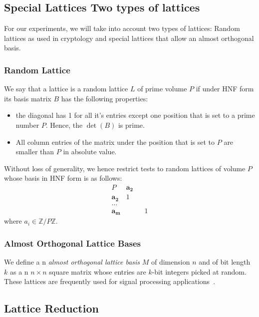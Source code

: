 \documentclass[10pt, a4paper]{article}
\newcommand{\my}[1]{{\color{blue} #1 }}
\renewcommand{\vec}[1]{\mathbf{#1}}
\begin{document}
\subsection{Special Lattices \my{Two types of lattices}}
\my{For our experiments, we will take into account two types of lattices: Random lattices as used in cryptology and special lattices that allow an almost orthogonal basis.}
\subsubsection{Random Lattice}

We say that a lattice is a random lattice $L$ of prime volume $P$ if under HNF form its basis matrix $B$ has the following properties:

\begin{itemize}
\item the diagonal has 1 for all it's entries except one position that is set to a prime number $P$. Hence, the $\det(B)$ is prime.
\item All column entries of the matrix under the position that is set to $P$ are smaller than $P$ in absolute value.
\end{itemize}

Without loss of generality, we hence restrict tests to random lattices of volume $P$ whose basis in HNF form is as follows:
\my{$$\begin{array}{ccccc}
P & \vec{a_2} &  & \\
\vec{a_2} & 1&   & \\ 
\dots & &  & \\ 
\vec{a_{m}} & & &1 
\end{array}$$}
where $a_i \in \mathbb{Z}/ P\mathbb{Z}$.

\subsubsection{Almost Orthogonal Lattice Bases}

We define a\my{n} \emph{almost orthogonal lattice basis} $M$ of dimension $n$ and of bit length $k$ as a\my{n} $n \times n$ square matrix whose entries are $k$-bit \my{integers} picked at random. These lattices are frequently used for signal processing applications~\cite{originalJacobiMethodLatticeBasisReduction}.

\subsection{Lattice Reduction}
\end{document}
